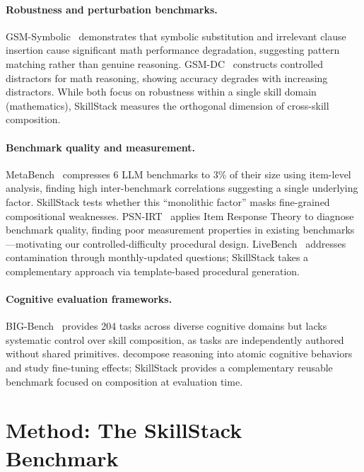 \documentclass{article}
\begin{document}
\paragraph{Robustness and perturbation benchmarks.}
GSM-Symbolic~\citep{mirzadeh2025gsmsymbolic} demonstrates that symbolic substitution and irrelevant clause insertion cause significant math performance degradation, suggesting pattern matching rather than genuine reasoning. GSM-DC~\citep{yang2025gsmdc} constructs controlled distractors for math reasoning, showing accuracy degrades with increasing distractors. While both focus on robustness within a single skill domain (mathematics), SkillStack measures the orthogonal dimension of cross-skill composition.

\paragraph{Benchmark quality and measurement.}
MetaBench~\citep{kipnis2025metabench} compresses 6 LLM benchmarks to 3\% of their size using item-level analysis, finding high inter-benchmark correlations suggesting a single underlying factor. SkillStack tests whether this ``monolithic factor'' masks fine-grained compositional weaknesses. PSN-IRT~\citep{zhou2026lost} applies Item Response Theory to diagnose benchmark quality, finding poor measurement properties in existing benchmarks---motivating our controlled-difficulty procedural design. LiveBench~\citep{white2025livebench} addresses contamination through monthly-updated questions; SkillStack takes a complementary approach via template-based procedural generation.

\paragraph{Cognitive evaluation frameworks.}
BIG-Bench~\citep{srivastava2023beyond} provides 204 tasks across diverse cognitive domains but lacks systematic control over skill composition, as tasks are independently authored without shared primitives. \citet{bai2025how} decompose reasoning into atomic cognitive behaviors and study fine-tuning effects; SkillStack provides a complementary reusable benchmark focused on composition at evaluation time.

\section{Method: The SkillStack Benchmark}
\label{sec:method}
\end{document}
